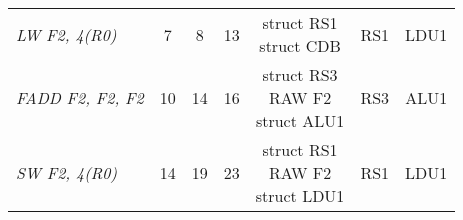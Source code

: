 \begin{enumerate}
\begin{table}[H]
\begin{tabular}{l|ccc|ccc}
                \textit{LW F2, 4(R0)}                     & 7              & 8                  & 13             & \makecell{struct RS1 \\ struct CDB}            & RS1         & LDU1          \\
                \textit{FADD F2, F2, F2}                  & 10             & 14                 & 16             & \makecell{struct RS3 \\ RAW F2 \\ struct ALU1} & RS3         & ALU1          \\
                \textit{SW F2, 4(R0)}                     & 14             & 19                 & 23             & \makecell{struct RS1 \\ RAW F2 \\ struct LDU1} & RS1         & LDU1         
                \end{tabular}
            \end{table}
\end{enumerate}